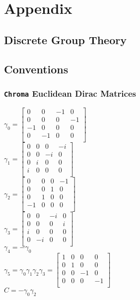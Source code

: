 \chapter{Appendix}
\label{sec:app}

\section{Discrete Group Theory}

\section{Conventions}

\subsection{\texttt{Chroma} Euclidean Dirac Matrices}
$\gamma_0 = 
\begin{bmatrix}
    0 & 0 & -1 & 0 \\
    0 & 0 & 0 & -1 \\
    -1 & 0 & 0 & 0 \\
    0 & -1 & 0 & 0 \\
    \end{bmatrix}$
\\
$\gamma_1 = 
\begin{bmatrix}
    0 & 0 & 0 & -i \\
    0 & 0 & -i & 0 \\
    0 & i & 0 & 0 \\
    i & 0 & 0 & 0 \\
    \end{bmatrix}$
\\
$\gamma_2 = 
\begin{bmatrix}
    0 & 0 & 0 & -1 \\
    0 & 0 & 1 & 0 \\
    0 & 1 & 0 & 0 \\
    -1 & 0 & 0 & 0 \\
    \end{bmatrix}$
\\
$\gamma_3 = 
\begin{bmatrix}
    0 & 0 & -i & 0 \\
    0 & 0 & 0 & i \\
    i & 0 & 0 & 0 \\
    0 & -i & 0 & 0 \\
    \end{bmatrix}$
\\
$\gamma_4 = -\gamma_0$ \\
$\gamma_5 = \gamma_0\gamma_1\gamma_2\gamma_3 = 
\begin{bmatrix}
    1 & 0 & 0 & 0 \\
    0 & 1 & 0 & 0 \\
    0 & 0 & -1 & 0 \\
    0 & 0 & 0 & -1 \\
    \end{bmatrix}$
\\
$C = -\gamma_0\gamma_2$

